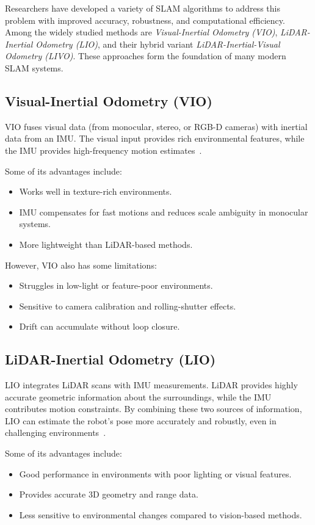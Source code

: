 \documentclass[english, bachelor, utf8]{base/thesis_telematics}
\begin{document}
Researchers have developed a variety of SLAM algorithms to address this problem with improved accuracy, robustness, and computational efficiency.
Among the widely studied methods are \textit{Visual-Inertial Odometry (VIO)}, \textit{LiDAR-Inertial Odometry (LIO)}, and their hybrid variant \textit{LiDAR-Inertial-Visual Odometry (LIVO)}. 
These approaches form the foundation of many modern SLAM systems.
\subsection{Visual-Inertial Odometry (VIO)}
VIO fuses visual data (from monocular, stereo, or RGB-D cameras) with inertial data from an IMU. 
The visual input provides rich environmental features, while the IMU provides high-frequency motion estimates~\cite{inertiallabs_vio_revolution,Survey_odometry}.

Some of its advantages include:
\begin{itemize}
    \item Works well in texture-rich environments.
    \item IMU compensates for fast motions and reduces scale ambiguity in monocular systems.
    \item More lightweight than LiDAR-based methods.
\end{itemize}

However, VIO also has some limitations:
\begin{itemize}
    \item Struggles in low-light or feature-poor environments.
    \item Sensitive to camera calibration and rolling-shutter effects.
    \item Drift can accumulate without loop closure.
\end{itemize}

\subsection{LiDAR-Inertial Odometry (LIO)}
LIO integrates LiDAR scans with IMU measurements. LiDAR provides highly accurate geometric information about the surroundings, while the IMU contributes motion constraints.
By combining these two sources of information, LIO can estimate the robot's pose more accurately and robustly, even in challenging environments~\cite{lee2024_lidar_odometry_survey,fastlio2}.

Some of its advantages include:
\begin{itemize}
    \item Good performance in environments with poor lighting or visual features.
    \item Provides accurate 3D geometry and range data.
    \item Less sensitive to environmental changes compared to vision-based methods.
\end{itemize}
\end{document}
